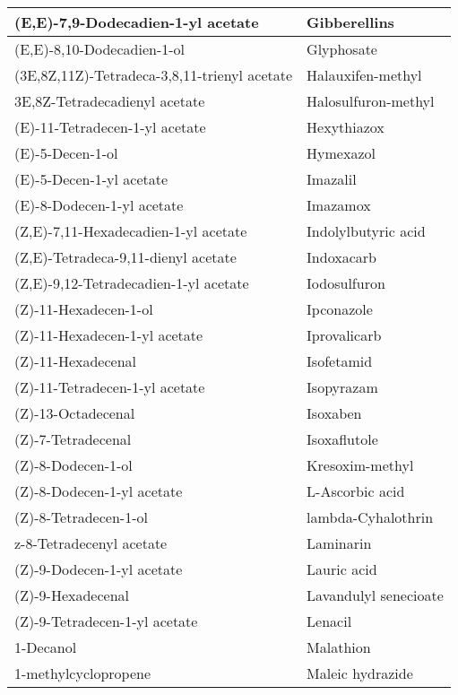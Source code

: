 \begin{small}
\begin{longtable}{|l|l|}
\hline 
\endlastfoot
(E,E)-7,9-Dodecadien-1-yl acetate & Gibberellins \\ \hline
        (E,E)-8,10-Dodecadien-1-ol & Glyphosate \\ \hline
        (3E,8Z,11Z)-Tetradeca-3,8,11-trienyl acetate & Halauxifen-methyl \\ \hline
        3E,8Z-Tetradecadienyl acetate & Halosulfuron-methyl \\ \hline
        (E)-11-Tetradecen-1-yl acetate & Hexythiazox \\ \hline
        (E)-5-Decen-1-ol & Hymexazol \\ \hline
        (E)-5-Decen-1-yl acetate & Imazalil \\ \hline
        (E)-8-Dodecen-1-yl acetate & Imazamox \\ \hline
        (Z,E)-7,11-Hexadecadien-1-yl acetate & Indolylbutyric acid \\ \hline
        (Z,E)-Tetradeca-9,11-dienyl acetate & Indoxacarb \\ \hline
        (Z,E)-9,12-Tetradecadien-1-yl acetate & Iodosulfuron \\ \hline
        (Z)-11-Hexadecen-1-ol & Ipconazole \\ \hline
        (Z)-11-Hexadecen-1-yl acetate & Iprovalicarb \\ \hline
        (Z)-11-Hexadecenal & Isofetamid \\ \hline
        (Z)-11-Tetradecen-1-yl acetate & Isopyrazam \\ \hline
        (Z)-13-Octadecenal & Isoxaben \\ \hline
        (Z)-7-Tetradecenal & Isoxaflutole \\ \hline
        (Z)-8-Dodecen-1-ol & Kresoxim-methyl \\ \hline
        (Z)-8-Dodecen-1-yl acetate & L-Ascorbic acid \\ \hline
        (Z)-8-Tetradecen-1-ol & lambda-Cyhalothrin \\ \hline
        z-8-Tetradecenyl acetate & Laminarin \\ \hline
        (Z)-9-Dodecen-1-yl acetate & Lauric acid \\ \hline
        (Z)-9-Hexadecenal & Lavandulyl senecioate \\ \hline
        (Z)-9-Tetradecen-1-yl acetate & Lenacil \\ \hline
        1-Decanol & Malathion \\ \hline
        1-methylcyclopropene & Maleic hydrazide \\ \hline

\end{longtable}
\end{small}
